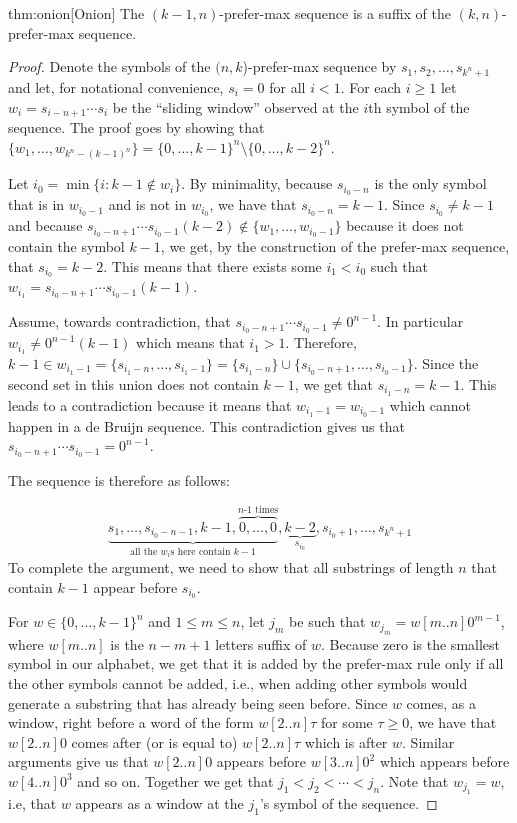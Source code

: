 \documentclass{article} %
\theoremstyle{definition} \newtheorem{definition}[theorem]{Definition}
\begin{document}
	
	\begin{repeatedtheorem}{thm:onion}[Onion] The $(k-1,n)$-prefer-max sequence is
		a suffix of the $(k,n)$-prefer-max sequence. \end{repeatedtheorem}
	\begin{proof} Denote the symbols of the $(n,k$)-prefer-max sequence by
		$s_1,s_2,\dots,s_{k^n+1}$ and let, for notational convenience, $s_i=0$ for all
		$i<1$.  For each $i\geq 1$ let $w_i=s_{i-n+1}\cdots s_i$ be the ``sliding
		window'' observed at the $i$th symbol of the sequence. The proof goes by
		showing that $\{w_1,\dots,w_{k^n-(k-1)^n}\} = \{0,\dots,k-1\}^n \setminus
		\{0,\dots,k-2\}^n$.
		
		Let ${i_0} = \min\{i\colon k-1 \notin w_i\}$. By minimality, because
		$s_{{i_0}-n}$ is the only symbol that is in $w_{i_0-1}$ and is not in
		$w_{i_0}$, we have that $s_{{i_0}-n}=k-1$. Since $s_{i_0} \neq k-1$ and
		because $s_{{i_0}-n+1}\cdots s_{{i_0}-1} (k-2) \notin \{w_1,\dots,w_{i_0-1}\}$
		because it does not contain the symbol $k-1$, we get, by the construction of
		the prefer-max sequence, that $s_{{i_0}}=k-2$. This means that there exists
		some ${i_1}<{i_0}$ such that $w_{i_1} = s_{{i_0}-n+1}\cdots s_{{i_0}-1}(k-1)$.
		
		Assume, towards contradiction, that $s_{{i_0}-n+1}\cdots s_{{i_0}-1} \neq
		0^{n-1}$. In particular $w_{i_1} \neq 0^{n-1}(k-1)$ which means that ${i_1} >
		1$. Therefore, $k-1  \in w_{i_1-1}=
		\{s_{{i_1}-n},\dots,s_{{i_1}-1}\}=\{s_{{i_1}-n}\} \cup
		\{s_{{i_0}-n+1},\dots,s_{{i_0}-1}\}$. Since the second set in this union does
		not contain $k-1$, we get that $s_{{i_1}-n}=k-1$. This leads to a
		contradiction because it means that $w_{{i_1}-1} = w_{{i_0}-1}$ which cannot
		happen in a de Bruijn sequence. This contradiction gives us that
		$s_{{i_0}-n+1}\cdots s_{{i_0}-1} = 0^{n-1}$.
		
		The sequence is therefore as follows:
		
		$$\underbrace{s_1,\dots,s_{i_0-n-1},k-1,\overbrace{0,\dots,0}^\text{$n\text{-}1$ times}}_{\text{all the $w_i$s here contain $k-1$}},\underbrace{k-2}_{s_{i_0}},s_{i_0+1},\dots,s_{k^n+1}$$ To complete the argument, we need to show that all substrings of length $n$ that contain $k-1$ appear before $s_{i_0}$.
		
		For $w \in \{0,\dots,k-1\}^n$ and $1 \leq m \leq n$, let $j_m$ be such that
		$w_{j_m} = w[m..n]0^{m-1}$, where $w[m..n]$ is the $n-m+1$ letters suffix of
		$w$. Because zero is the smallest symbol in our alphabet, we get that it is
		added by the prefer-max rule only if all the other symbols cannot be added,
		i.e., when adding other symbols would generate a substring that has already
		being seen before. Since $w$ comes, as a window, right before a word of the
		form $w[2..n]\tau$ for some $\tau \geq 0$, we have that $w[2..n]0$ comes after
		(or is equal to) $w[2..n]\tau$ which is after $w$. Similar arguments give us
		that $w[2..n]0$ appears before $w[3..n]0^2$ which appears before $w[4..n]0^3$
		and so on. Together we get that $j_1 < j_2 < \cdots < j_n$. Note that
		$w_{j_1}=w$, i.e, that $w$ appears as a window at the $j_1$'s symbol of the
		sequence.
		

\end{proof}
\end{document}
